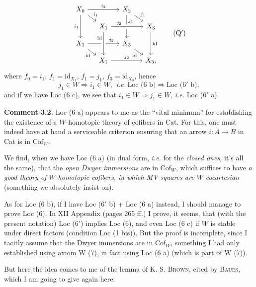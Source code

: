 \documentclass[11pt]{article}
\newcommand{\printedpage}[1]{\marginpar{\footnotesize p.~#1}}
\newcommand{\msp}[1]{\marginpar{\footnotesize [#1]}}
\newcommand{\Cof}{\mathrm{Cof}}
\newcommand{\id}{\mathrm{id}}
\begin{document}
\noindent\printedpage{14}
\[
\begin{tikzcd}[ampersand replacement=\&, row sep=small, column sep=small]
X_0 \arrow[rr, "i_2"] \arrow[dr, "i_1"] \arrow[dd, "i_1"'] \& \& X_2 \arrow[dr, "j_1"] \arrow[dd, "j_1" near start] \& \\
\& X_1 \arrow[rr, "j_2" near start, crossing over] \& \& X_3 \arrow[dd, "\id"] \\
X_1 \arrow[rr, "j_2" near end] \arrow[dr, "\id"'] \& \& X_3 \arrow[dr, "\id"'] \& \\
\& X_1 \arrow[rr, "j_2"] \arrow[from=2-2, "\id"' near start, crossing over] \& \& X_3,
\end{tikzcd}
\tag*{(Q$'$)} %
\]
where $f_0 = i_1$, $f_1 = \id_{X_1}$, $f_1 = j_1$, $f_3 = \id_{X_3}$, hence %
\[
j_1 \in W \Longrightarrow i_1 \in W, \ \ \textit{i.e.}\ \text{Loc (6 b)} \Longrightarrow \text{Loc (6$'$ b)},
\]
and if we have Loc (6 c), we see that $i_1 \in W \Longrightarrow j_1 \in W$, \textit{i.e.} Loc (6$'$ a).

\textbf{Comment 3.2.} Loc (6 a) appears to me as the ``vital minimum'' for establishing the existence of a $W$-homotopic theory of cofibers in Cat. For this, one must indeed have at hand a serviceable criterion ensuring that an arrow $i : A \longrightarrow B$ in Cat is in $\Cof_W$.

\msp{page 19}We find, when we have Loc (6 a) (in dual form, \textit{i.e.} for the \textit{closed ones,} it's all the same), that the \textit{open Dwyer immersions} are in $\Cof_W$, which suffices to have \textit{a good theory of $W$-homotopic cofibers, in which MV squares are $W$-cocartesian} (something we absolutely insist on). %

As for Loc (6 b), if I have Loc (6$'$ b) + Loc (6 a) instead, I should manage to prove Loc (6). In XII Appendix (pages 265 ff.) I prove, it seems, that (with the present notation) Loc (6$'$) implies Loc (6), and even Loc (6 c) if $W$ is stable under direct factors (condition Loc (1 bis)). But the proof is incomplete, since I tacitly assume that the Dwyer immersions are in $\Cof_W$, something I had only established using axiom W (7), in fact using Loc (6 a) (which is part of W (7)).

\msp{page 20}But here the idea comes to me of the lemma of K. S. \textsc{Brown}, cited by \textsc{Baues}, which I am going to give again here:
\end{document}
